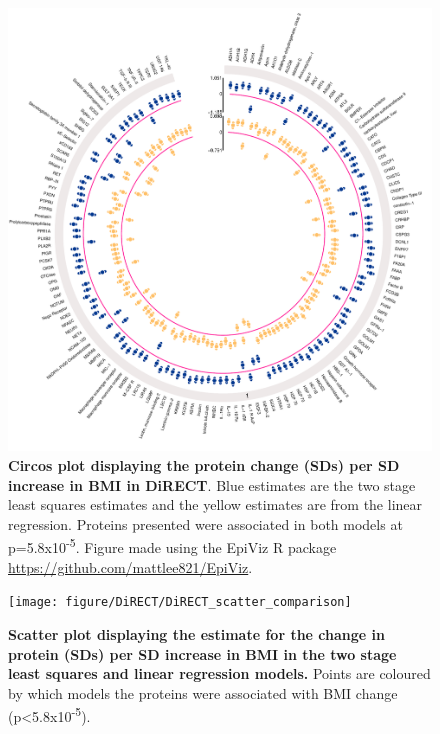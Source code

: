 \documentclass[11pt,twoside]{bristolthesis}
\newcommand{\blandscape}{\begin{landscape}}
\newcommand{\elandscape}{\end{landscape}}
\begin{document}
\begin{figure}

{\centering \includegraphics[width=0.8\linewidth]{figure/DiRECT/circos_plot_BMI_change_protein_ols_tsls} 

}

\caption[Circos plot of proteins associated with BMI change in DiRECT]{\textbf{Circos plot displaying the protein change (SDs) per SD increase in BMI in DiRECT}. Blue estimates are the two stage least squares estimates and the yellow estimates are from the linear regression. Proteins presented were associated in both models at p=5.8x10\textsuperscript{-5}. Figure made using the EpiViz R package \url{https://github.com/mattlee821/EpiViz}.}\label{fig:circos}
\end{figure}
\blandscape



\begin{figure}

{\centering \texttt{[image: figure/DiRECT/DiRECT\_scatter\_comparison]} 

}

\caption[Scatter plot comparing proteins association with BMI change across models in DiRECT]{\textbf{Scatter plot displaying the estimate for the change in protein (SDs) per SD increase in BMI in the two stage least squares and linear regression models.} Points are coloured by which models the proteins were associated with BMI change (p\textless5.8x10\textsuperscript{-5}).}\label{fig:scatter-DiRECT}
\end{figure}
\elandscape
\end{document}
